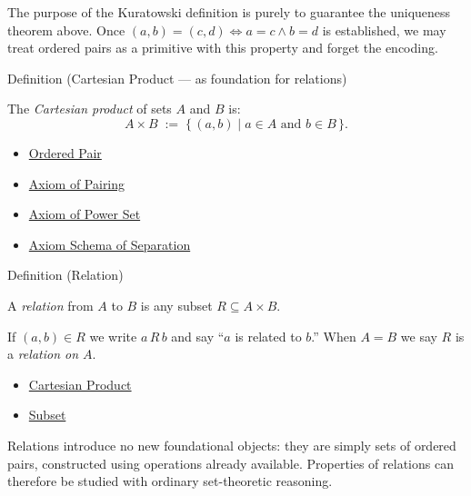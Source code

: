 \begin{remark*}
The purpose of the Kuratowski definition is purely to guarantee the uniqueness
theorem above. Once $(a,b) = (c,d) \iff a=c \land b=d$ is established,
we may treat ordered pairs as a primitive with this property and forget the
encoding.
\end{remark*}

\begin{definitionbox}{Definition (Cartesian Product --- as foundation for relations)}
\begin{definition}\label{def:cartesian-product-rel}
The \emph{Cartesian product} of sets $A$ and $B$ is:
\[
A \times B
\;:=\;
\{\, (a,b) \mid a \in A \text{ and } b \in B \,\}.
\]
\end{definition}
\end{definitionbox}

\begin{dependencies}
\begin{itemize}
  \item \hyperref[def:ordered-pair]{Ordered Pair}
  \item \hyperref[ax:pairing]{Axiom of Pairing}
  \item \hyperref[ax:power-set]{Axiom of Power Set}
  \item \hyperref[ax:separation]{Axiom Schema of Separation}
\end{itemize}
\end{dependencies}

\begin{definitionbox}{Definition (Relation)}
\begin{definition}[Relation]\label{def:relation}
A \emph{relation} from $A$ to $B$ is any subset $R \subseteq A \times B$.

If $(a,b) \in R$ we write $a \, R \, b$ and say ``$a$ is related to $b$.''
When $A = B$ we say $R$ is a \emph{relation on $A$}.
\end{definition}
\end{definitionbox}


\begin{dependencies}
\begin{itemize}
  \item \hyperref[def:cartesian-product-rel]{Cartesian Product}
  \item \hyperref[def:subset]{Subset}
\end{itemize}
\end{dependencies}

\begin{remark*}
Relations introduce no new foundational objects: they are simply sets of
ordered pairs, constructed using operations already available. Properties of
relations can therefore be studied with ordinary set-theoretic reasoning.
\end{remark*}

